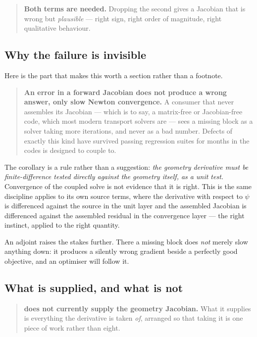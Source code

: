 \begin{quote}
	\textbf{Both terms are needed.} Dropping the second gives a Jacobian that is
	wrong but \emph{plausible} --- right sign, right order of magnitude, right
	qualitative behaviour.
\end{quote}

\subsection{Why the failure is invisible}

Here is the part that makes this worth a section rather than a footnote.

\begin{quote}
	\textbf{An error in a forward Jacobian does not produce a wrong answer, only
	slow Newton convergence.} A consumer that never assembles its Jacobian ---
	which is to say, a matrix-free or Jacobian-free code, which most modern
	transport solvers are --- sees a missing block as a solver taking more
	iterations, and never as a bad number. Defects of exactly this kind have
	survived passing regression suites for months in the codes {\meq} is designed
	to couple to.
\end{quote}

The corollary is a rule rather than a suggestion: \emph{the geometry derivative
must be finite-difference tested directly against the geometry itself, as a unit
test.} Convergence of the coupled solve is not evidence that it is right. This
is the same discipline {\meq} applies to its own source terms, where the
derivative with respect to $\psi$ is differenced against the source in the unit
layer and the assembled Jacobian is differenced against the assembled residual in
the convergence layer --- the right instinct, applied to the right quantity.

An adjoint raises the stakes further. There a missing block does \emph{not} merely
slow anything down: it produces a silently wrong gradient beside a perfectly good
objective, and an optimiser will follow it.

\subsection{What is supplied, and what is not}

\begin{quote}
	\textbf{{\meq} does not currently supply the geometry Jacobian.} What it
	supplies is everything the derivative is taken \emph{of}, arranged so that
	taking it is one piece of work rather than eight.
\end{quote}

